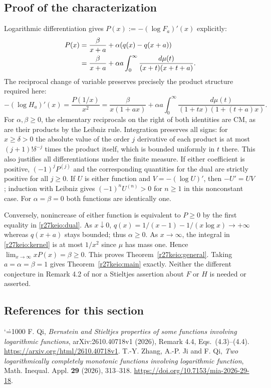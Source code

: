 \documentclass[11pt,a4paper]{article}
\makeatletter
\numberwithin{equation}{section}
\theoremstyle{definition}
\theoremstyle{remark}
\renewenvironment{thebibliography}[1]
 {\subsection*{References for this section}\small
  \list{\@biblabel{\@arabic\c@enumiv}}
       {\settowidth\labelwidth{\@biblabel{#1}}\leftmargin\labelwidth
        \advance\leftmargin\labelsep\@openbib@code
        \usecounter{enumiv}\let\p@enumiv\@empty
        \renewcommand\theenumiv{\@arabic\c@enumiv}}
  \sloppy\clubpenalty4000\widowpenalty4000\sfcode`\.=1000\relax}
 {\def\@noitemerr{\@latex@warning{Empty bibliography}}\endlist}
\makeatother
\begin{document}
\subsection{Proof of the characterization}
Logarithmic differentiation gives $P(x):=-(\log F_a)'(x)$ explicitly:
\begin{align}
 P(x)&=\frac{\beta}{x+a}+\alpha(q(x)-q(x+a))\notag\\
 &=\frac{\beta}{x+a}+\alpha a\int_0^\infty
 \frac{d\mu(t)}{(x+t)(x+t+a)}.\label{r27keio:kernel}
\end{align}
The reciprocal change of variable preserves precisely the product structure required here:
\begin{equation}
 -(\log H_a)'(x)=\frac{P(1/x)}{x^2}
 =\frac{\beta}{x(1+ax)}+\alpha a\int_0^\infty
 \frac{d\mu(t)}{(1+tx)(1+(t+a)x)}.\label{r27keio:dual}
\end{equation}
For $\alpha,\beta\ge0$, the elementary reciprocals on the right of both identities are CM, as are their products by the Leibniz rule. Integration preserves all signs: for $x\ge\delta>0$ the absolute value of the order $j$ derivative of each product is at most $(j+1)!\delta^{-j}$ times the product itself, which is bounded uniformly in $t$ there. This also justifies all differentiations under the finite measure. If either coefficient is positive, $(-1)^j P^{(j)}$ and the corresponding quantities for the dual are strictly positive for all $j\ge0$. If $U$ is either function and $V=-(\log U)'$, then $-U'=UV$; induction with Leibniz gives $(-1)^n U^{(n)}>0$ for $n\ge1$ in this nonconstant case. For $\alpha=\beta=0$ both functions are identically one.
    
Conversely, nonincrease of either function is equivalent to $P\ge0$ by the first equality in \eqref{r27keio:dual}. As $x\downarrow0$, $q(x)=1/(x-1)-1/(x\log x)\to+\infty$ whereas $q(x+a)$ stays bounded; thus $\alpha\ge0$. As $x\to\infty$, the integral in \eqref{r27keio:kernel} is at most $1/x^2$ since $\mu$ has mass one. Hence $\lim_{x\to\infty}xP(x)=\beta\ge0$. This proves Theorem~\ref{r27keio:general}. Taking $a=\alpha=\beta=1$ gives Theorem~\ref{r27keio:main} exactly. Neither the different conjecture in Remark 4.2 of \cite{r27keio:Qi} nor a Stieltjes assertion about $F$ or $H$ is needed or asserted.
\begin{thebibliography}{9}
 F. Qi, \emph{Bernstein and Stieltjes properties of some functions involving logarithmic functions}, arXiv:2610.40718v1 (2026), Remark 4.4, Eqs.~(4.3)--(4.4). \url{https://arxiv.org/html/2610.40718v1}.
 T.-Y. Zhang, A.-P. Ji and F. Qi, \emph{Two logarithmically completely monotonic functions involving logarithmic function}, Math. Inequal. Appl. \textbf{29} (2026), 313--318. \url{https://doi.org/10.7153/mia-2026-29-18}.
\end{thebibliography}
\end{document}
